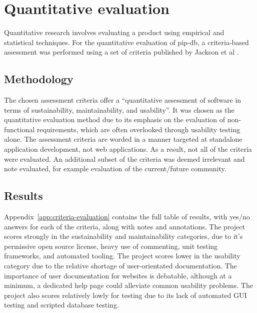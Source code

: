 \section{Quantitative evaluation}\label{sec:quantitative-evaluation}

Quantitative research involves evaluating a product using empirical
and statistical techniques. For the quantitative evaluation of pip-db,
a criteria-based assessment was performed using a set of criteria
published by Jackson et al \cite{jackson2011evaluation}.

\subsection{Methodology}

The chosen assessment criteria offer a ``quantitative assessment of
software in terms of sustainability, maintainability, and
usability''. It was chosen as the quantitative evaluation method due
to its emphasis on the evaluation of non-functional requirements,
which are often overlooked through usability testing alone. The
assessment criteria are worded in a manner targeted at standalone
application development, not web applications. As a result, not all of
the criteria were evaluated. An additional subset of the criteria was
deemed irrelevant and note evaluated, for example evaluation of the
current/future community.

\subsection{Results}

Appendix~\ref{app:criteria-evaluation} contains the full table of
results, with yes/no answers for each of the criteria, along with
notes and annotations. The project scores strongly in the
sustainability and maintainability categories, due to it's permissive
open source license, heavy use of commenting, unit testing frameworks,
and automated tooling. The project scores lower in the usability
category due to the relative shortage of user-orientated
documentation. The importance of user documentation for websites is
debatable, although at a minimum, a dedicated help page could
alleviate common usability problems. The project also scores
relatively lowly for testing due to its lack of automated GUI testing
and scripted database testing.
